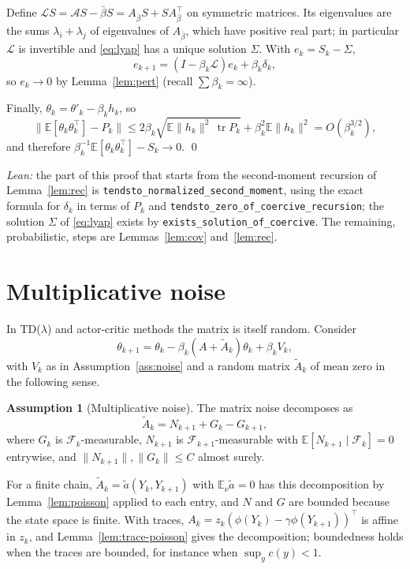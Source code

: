 \documentclass[11pt]{article}
\theoremstyle{definition}
\newtheorem{assumption}[theorem]{Assumption}
\theoremstyle{remark}
\newcommand{\E}{\mathbb{E}}
\newcommand{\F}{\mathcal{F}}
\newcommand{\Lop}{\mathcal{L}}
\DeclareMathOperator{\tr}{tr}
\begin{document}
Define $\Lop S = \mathcal AS - \bar\beta S = A_{\bar\beta}S + SA_{\bar\beta}^\top$ on symmetric
matrices. Its eigenvalues are the sums $\lambda_i + \lambda_j$ of eigenvalues of
$A_{\bar\beta}$, which have positive real part; in particular $\Lop$ is invertible and
\eqref{eq:lyap} has a unique solution $\Sigma$. With $e_k = S_k - \Sigma$,
\[
  e_{k+1} = (I - \beta_k\Lop)e_k + \beta_k\delta_k ,
\]
so $e_k \to 0$ by Lemma~\ref{lem:pert} (recall $\sum\beta_k = \infty$).

Finally, $\theta_k = \theta'_k - \beta_kh_k$, so
\[
  \big\|\E[\theta_k\theta_k^\top] - P_k\big\| \le 2\beta_k\sqrt{\E\|h_k\|^2\,\tr P_k} + \beta_k^2\E\|h_k\|^2
  = O(\beta_k^{3/2}),
\]
and therefore $\beta_k^{-1}\E[\theta_k\theta_k^\top] - S_k \to 0$. \qed

\smallskip\noindent\emph{Lean:} the part of this proof that starts from the second-moment
recursion of Lemma~\ref{lem:rec} is \texttt{tendsto\_normalized\_second\_moment}, using the
exact formula for $\delta_k$ in terms of $P_k$ and \texttt{tendsto\_zero\_of\_coercive\_recursion};
the solution $\Sigma$ of \eqref{eq:lyap} exists by \texttt{exists\_solution\_of\_coercive}.
The remaining, probabilistic, steps are Lemmas~\ref{lem:cov} and~\ref{lem:rec}.

\section{Multiplicative noise}\label{sec:mult}

In TD($\lambda$) and actor-critic methods the matrix is itself random. Consider
\begin{equation}\label{eq:mult}
  \theta_{k+1} = \theta_k - \beta_k(A + \tilde A_k)\theta_k + \beta_kV_k,
\end{equation}
with $V_k$ as in Assumption~\ref{ass:noise} and a random matrix $\tilde A_k$ of mean zero
in the following sense.

\begin{assumption}[Multiplicative noise]\label{ass:mult}
The matrix noise decomposes as
\[
  \tilde A_k = N_{k+1} + G_k - G_{k+1},
\]
where $G_k$ is $\F_k$-measurable, $N_{k+1}$ is $\F_{k+1}$-measurable with
$\E[N_{k+1}\mid\F_k] = 0$ entrywise, and $\|N_{k+1}\|, \|G_k\| \le C$ almost surely.
\end{assumption}

For a finite chain, $\tilde A_k = \tilde a(Y_k, Y_{k+1})$ with $\E_\nu\tilde a = 0$ has this
decomposition by Lemma~\ref{lem:poisson} applied to each entry, and $N$ and $G$ are bounded
because the state space is finite. With traces, $A_k = z_k(\phi(Y_k) - \gamma\phi(Y_{k+1}))^\top$
is affine in $z_k$, and Lemma~\ref{lem:trace-poisson} gives the decomposition; boundedness holds
when the traces are bounded, for instance when $\sup_yc(y) < 1$.
\end{document}
